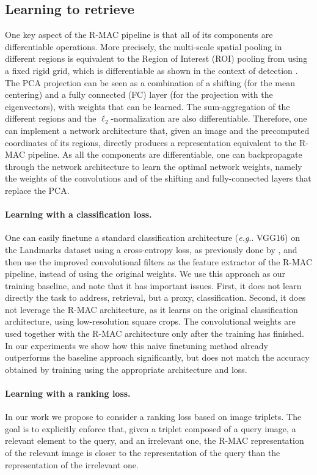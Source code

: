 \documentclass[twocolumn]{svjour3}          \smartqed  \usepackage{graphicx}
\makeatletter
\DeclareRobustCommand\onedot{\futurelet\@let@token\@onedot}
\def\@onedot{\ifx\@let@token.\else.\null\fi\xspace}
\def\eg{\emph{e.g}\onedot} \def\Eg{\emph{E.g}\onedot}
\makeatother
\begin{document}
\subsection{Learning to retrieve}
\label{sec:learning}

One key aspect of the R-MAC pipeline is that all of its components are differentiable operations. More precisely, the multi-scale spatial pooling in different regions is equivalent to the Region of Interest (ROI) pooling from \cite{He2014} using a fixed rigid grid, which is differentiable
as shown in the context of detection \citep{Girshick2015}.
The PCA projection can be seen as a combination of a shifting (for the mean centering) and a fully connected (FC) layer (for the projection with the eigenvectors), with weights that can be learned. The sum-aggregation of the different regions and the $\ell_2$-normalization are also differentiable.
Therefore, one can implement a network architecture that, given an image and the precomputed coordinates of its regions, directly produces a representation equivalent to the R-MAC pipeline.
As all the components are differentiable, one can backpropagate through the network architecture to learn the optimal network weights, namely the weights of the convolutions and of the shifting and fully-connected layers that replace the PCA.

\paragraph{Learning with a classification loss.}
One can easily finetune a standard classification architecture (\eg VGG16) on the Landmarks dataset using a cross-entropy loss, as previously done by \cite{Babenko2014}, and then use the improved convolutional filters as the feature extractor of the R-MAC pipeline, instead of using the original weights. We use this approach as our training baseline, and note that it has important issues.
First, it does not learn directly the task to address, retrieval, but a proxy, classification.
Second, it does not leverage the R-MAC architecture, as it learns on the original classification architecture, using low-resolution square crops.
The convolutional weights are used together with the R-MAC architecture only after the training has finished.
In our experiments we show how this naive finetuning method already outperforms the baseline approach significantly, but does not match the accuracy obtained by training using the appropriate architecture and loss.

\paragraph{Learning with a ranking loss.}
In our work we propose to consider a ranking loss based on image triplets. The goal is to explicitly enforce that, given a triplet composed of a query image, a relevant element to the query, and an irrelevant one, the R-MAC representation of the relevant image is closer to the representation of the query than the representation of the irrelevant one. 
\end{document}
